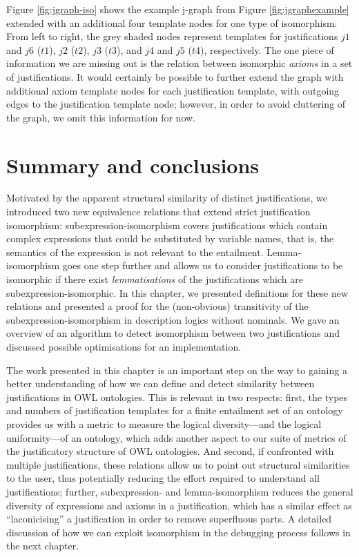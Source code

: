 Figure \ref{fig:jgraph-iso} shows the example j-graph from Figure \ref{fig:jgraphexample} extended with an additional four template nodes for one type of isomorphism. From left to right, the grey shaded nodes represent templates for justifications $j1$ and $j6$ ($t1$), $j2$ ($t2$), $j3$ ($t3$), and $j4$ and $j5$ ($t4$), respectively. The one piece of information we are missing out is the relation between isomorphic \emph{axioms} in a set of justifications. It would certainly be possible to further extend the graph with additional axiom template nodes for each justification template, with outgoing edges to the justification template node; however, in order to avoid cluttering of the graph, we omit this information for now.




\section{Summary and conclusions}

Motivated by the apparent structural similarity of distinct justifications, we introduced two new equivalence relations that extend strict justification isomorphism: subexpression-isomorphism covers justifications which contain complex expressions that could be substituted by variable names, that is, the semantics of the expression is not relevant to the entailment. Lemma-isomorphism goes one step further and allows us to consider justifications to be isomorphic if there exist \emph{lemmatisations} of the justifications which are subexpression-isomorphic. In this chapter, we presented definitions for these new relations and presented a proof for the (non-obvious) transitivity of the subexpression-isomorphism in description logics without nominals. We gave an overview of an algorithm to detect isomorphism between two justifications and discussed possible optimisations for an implementation.

The work presented in this chapter is an important step on the way to gaining a better understanding of how we can define and detect similarity between justifications in OWL ontologies. This is relevant in two respects: first, the types and numbers of justification templates for a finite entailment set of an ontology provides us with a metric to measure the logical diversity---and the logical uniformity---of an ontology, which adds another aspect to our suite of metrics of the justificatory structure of OWL ontologies. And second, if confronted with multiple justifications, these relations allow us to point out structural similarities to the user, thus potentially reducing the effort required to understand all justifications; further, subexpression- and lemma-isomorphism reduces the general diversity of expressions and axioms in a justification, which has a similar effect as \enquote{laconicising} a justification in order to remove superfluous parts. A detailed discussion of how we can exploit isomorphism in the debugging process follows in the next chapter. 
	